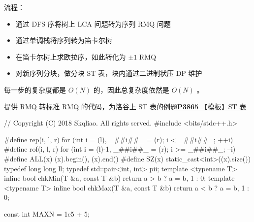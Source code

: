 流程：

\begin{itemize}
\item 通过 DFS 序将树上 LCA 问题转为序列 RMQ 问题
\item 通过单调栈将序列转为笛卡尔树
\item 在笛卡尔树上求欧拉序，如此转化为 $\pm 1$ RMQ
\item 对新序列分块，做分块 ST 表，块内通过二进制状压 DP 维护
\end{itemize}

每一步的复杂度都是 $O(N)$ 的，因此总复杂度依然是 $O(N)$ 。

提供 RMQ 转标准 RMQ 的代码，为洛谷上 ST 表的例题\href{https://www.luogu.org/problemnew/show/P3865}{\textbf{P3865} 【模板】ST 表}

\begin{cppcode}
// Copyright (C) 2018 Skqliao. All rights served.
#include <bits/stdc++.h>

#define rep(i, l, r) for (int i = (l), _##i##_ = (r); i < _##i##_; ++i)
#define rof(i, l, r) for (int i = (l)-1, _##i##_ = (r); i >= _##i##_; --i)
#define ALL(x) (x).begin(), (x).end()
#define SZ(x) static_cast<int>((x).size())
typedef long long ll;
typedef std::pair<int, int> pii;
template <typename T>
inline bool chkMin(T &a, const T &b) {
  return a > b ? a = b, 1 : 0;
}
template <typename T>
inline bool chkMax(T &a, const T &b) {
  return a < b ? a = b, 1 : 0;
}

const int MAXN = 1e5 + 5;


\end{cppcode}
